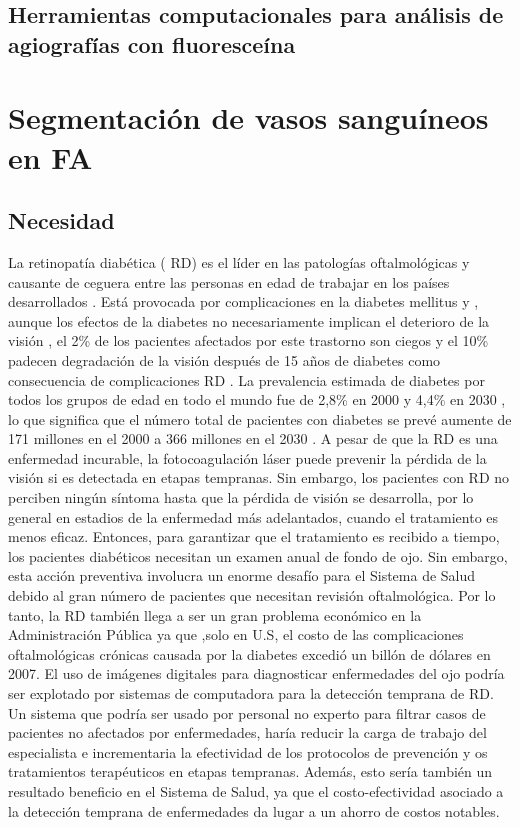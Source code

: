 	\subsection{Herramientas computacionales para an\'alisis de agiograf\'ias con fluoresce\'ina}
	


\section{Segmentaci\'on de vasos sangu\'ineos en FA}

	\subsection{Necesidad}
	La retinopatía diabética ( RD) es el líder en las patologías oftalmológicas y causante de ceguera entre las personas en edad de trabajar en los países desarrollados . Está provocada por complicaciones en la diabetes mellitus y , aunque los efectos de la diabetes no necesariamente implican el deterioro de la visión , el 2\% de los pacientes afectados por este trastorno son ciegos y el 10\% padecen  degradación de la visión después de 15 años de diabetes como consecuencia de complicaciones RD . La prevalencia estimada de diabetes por todos los grupos de edad en todo el mundo fue de 2,8\% en 2000 y 4,4\% en 2030 , lo que significa que el número total de pacientes con diabetes se prevé aumente de 171 millones en el  2000 a 366 millones en el 2030 .
	A pesar de que la RD es una enfermedad incurable, la fotocoagulación láser puede prevenir la pérdida de la visión si es detectada en etapas tempranas. Sin embargo, los pacientes con RD no perciben ningún síntoma hasta que la pérdida de visión se desarrolla, por lo general en estadios de la enfermedad más adelantados, cuando el tratamiento es menos eficaz. Entonces, para garantizar que el tratamiento es recibido a tiempo, los pacientes diabéticos necesitan un examen anual de fondo de ojo. Sin embargo, esta acción preventiva involucra un enorme desafío para el Sistema de Salud debido  al gran número de pacientes que necesitan revisión oftalmológica. Por lo tanto, la RD también llega a ser un gran problema económico en la  Administración Pública ya que ,solo en U.S, el costo de las complicaciones oftalmológicas crónicas causada por la diabetes excedió un billón de dólares en 2007. 
El uso de imágenes digitales para diagnosticar enfermedades del ojo podría ser explotado por sistemas de computadora para la detección temprana de RD. Un sistema que podría ser  usado por personal no experto para filtrar casos de pacientes no afectados por enfermedades, haría reducir la carga de trabajo del especialista e incrementaria la efectividad de los protocolos de prevención y os tratamientos terapéuticos en etapas tempranas. Además, esto sería también un resultado beneficio en el Sistema de Salud, ya que el costo-efectividad asociado a la detección temprana de enfermedades da lugar a un ahorro de costos notables.
